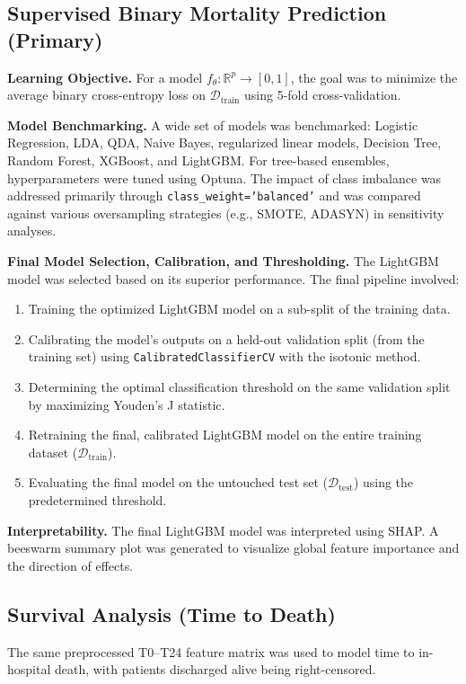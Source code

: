 \subsection{Supervised Binary Mortality Prediction (Primary)}
\textbf{Learning Objective.} For a model $f_\theta:\mathbb{R}^p\!\to\![0,1]$, the goal was to minimize the average binary cross-entropy loss on $\mathcal{D}_{\text{train}}$ using 5-fold cross-validation.

\textbf{Model Benchmarking.} A wide set of models was benchmarked: Logistic Regression, LDA, QDA, Naive Bayes, regularized linear models, Decision Tree, Random Forest, XGBoost, and LightGBM. For tree-based ensembles, hyperparameters were tuned using Optuna. The impact of class imbalance was addressed primarily through \texttt{class\_weight='balanced'} and was compared against various oversampling strategies (e.g., SMOTE, ADASYN) in sensitivity analyses.

\textbf{Final Model Selection, Calibration, and Thresholding.} The LightGBM model was selected based on its superior performance. The final pipeline involved:
\begin{enumerate}
    \item Training the optimized LightGBM model on a sub-split of the training data.
    \item Calibrating the model's outputs on a held-out validation split (from the training set) using \texttt{CalibratedClassifierCV} with the isotonic method.
    \item Determining the optimal classification threshold on the same validation split by maximizing Youden's J statistic.
    \item Retraining the final, calibrated LightGBM model on the entire training dataset ($\mathcal{D}_{\text{train}}$).
    \item Evaluating the final model on the untouched test set ($\mathcal{D}_{\text{test}}$) using the predetermined threshold.
\end{enumerate}

\textbf{Interpretability.} The final LightGBM model was interpreted using SHAP. A beeswarm summary plot was generated to visualize global feature importance and the direction of effects.

\subsection{Survival Analysis (Time to Death)}
The same preprocessed T0--T24 feature matrix was used to model time to in-hospital death, with patients discharged alive being right-censored.

